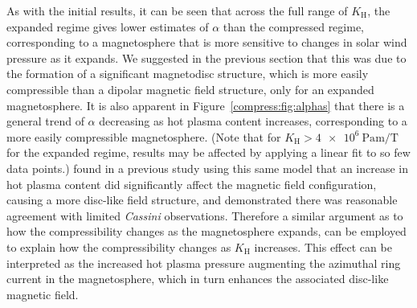 As with the initial results, it can be seen that across the full range of $K_\mathrm{H}$, the expanded regime gives lower estimates of $\alpha$ than the compressed regime, corresponding to a magnetosphere that is more sensitive to changes in solar wind pressure as it expands. We suggested in the previous section that this was due to the formation of a significant magnetodisc structure, which is more easily compressible than a dipolar magnetic field structure, only for an expanded magnetosphere. It is also apparent in Figure~\ref{compress:fig:alphas} that there is a general trend of $\alpha$ decreasing as hot plasma content increases, corresponding to a more easily compressible magnetosphere. (Note that for $K_\mathrm{H} > \SI{4e6}{\pascal\meter\per\tesla}$ for the expanded regime, results may be affected by applying a linear fit to so few data points.) \citet{achilleos2010b} found in a previous study using this same model that an increase in hot plasma content did significantly affect the magnetic field configuration, causing a more disc-like field structure, and demonstrated there was reasonable agreement with limited \textit{Cassini} observations. Therefore a similar argument as to how the compressibility changes as the magnetosphere expands, can be employed to explain how the compressibility changes as $K_\mathrm{H}$ increases. This effect can be interpreted as the increased hot plasma pressure augmenting the azimuthal ring current in the magnetosphere, which in turn enhances the associated disc-like magnetic field.

